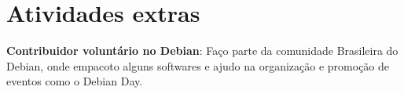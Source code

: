 \documentclass[12pt,a4paper,sans]{moderncv}        %
\begin{document}
\section{Atividades extras}

\textbf{Contribuidor voluntário no Debian}: Faço parte da comunidade Brasileira do Debian, onde empacoto alguns softwares e ajudo na organização e promoção de eventos como o Debian Day.\newline





\end{document}
